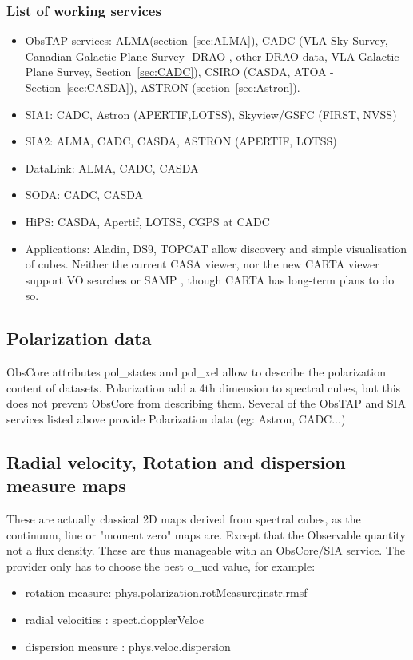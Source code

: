 \documentclass[11pt,a4paper]{ivoa}
\begin{document}
\subsubsection{List of working services}
\begin{itemize}
\item ObsTAP services: ALMA(section~\ref{sec:ALMA}), CADC (VLA Sky Survey, Canadian Galactic Plane 
Survey -DRAO-, other DRAO data, VLA Galactic Plane Survey, Section~\ref{sec:CADC}), CSIRO (CASDA, ATOA - 
Section~\ref{sec:CASDA}), ASTRON (section~\ref{sec:Astron}).
\item SIA1: CADC, Astron (APERTIF,LOTSS), Skyview/GSFC (FIRST, NVSS)
\item SIA2: ALMA, CADC, CASDA, ASTRON (APERTIF, LOTSS)
\item DataLink: ALMA, CADC, CASDA
\item SODA: CADC, CASDA
\item HiPS: CASDA, Apertif, LOTSS, CGPS at CADC
\item Applications: Aladin, DS9, TOPCAT allow discovery and simple visualisation of cubes. Neither the 
current CASA viewer, nor the new CARTA viewer support VO searches or SAMP \citep{2009ivoa.spec.0421B}, 
though CARTA has long-term plans to do so.
\end{itemize}


\subsection{Polarization data}
ObsCore attributes pol\_states and pol\_xel allow to describe the polarization content of datasets. 
Polarization add a 4th dimension to spectral cubes, but this does not prevent ObsCore from describing 
them. Several of the ObsTAP and SIA services listed above provide Polarization data (eg: Astron, 
CADC...)


\subsection{Radial velocity, Rotation and dispersion measure maps}
These are actually classical 2D maps derived from spectral cubes, as the continuum, line or "moment 
zero" maps are. Except that the Observable quantity not a flux density. These are thus manageable with 
an ObsCore/SIA service. The provider only has to choose the best o\_ucd value, for example:

\begin{itemize}
    \item rotation measure: phys.polarization.rotMeasure;instr.rmsf
    \item radial velocities : spect.dopplerVeloc
    \item dispersion measure : phys.veloc.dispersion
\end{itemize}
\end{document}
